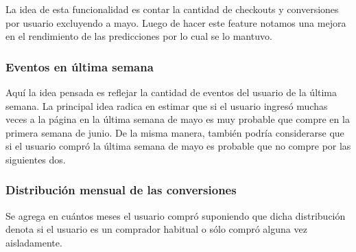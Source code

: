 \documentclass[a4paper]{article}
\begin{document}
\begin{sloppypar}
	\texttt{}
\end{sloppypar}

La idea de esta funcionalidad es contar la cantidad de checkouts y conversiones por usuario excluyendo a mayo. Luego de hacer este feature notamos una mejora en el rendimiento de las predicciones por lo cual se lo mantuvo.


\subsubsection{Eventos en última semana}

\begin{sloppypar}
	\texttt{}
\end{sloppypar}

Aquí la idea pensada es reflejar la cantidad de eventos del usuario de la última semana. La principal idea radica en estimar que si el usuario ingresó muchas veces a la página en la última semana de mayo es muy probable que compre en la primera semana de junio. De la misma manera, también podría considerarse que si el usuario compró la última semana de mayo es probable que no compre por las siguientes dos.

\subsubsection{Distribución mensual de las conversiones}

\begin{sloppypar}
	\texttt{}
\end{sloppypar}

Se agrega en cuántos meses el usuario compró suponiendo que dicha distribución denota si el usuario es un comprador habitual o sólo compró alguna vez aisladamente. 
\end{document}
